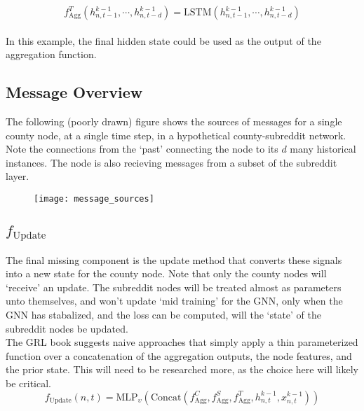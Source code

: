 \documentclass{article}
\begin{document}
$$f_{\text{Agg}}^T(h_{n,t-1}^{k-1}, \cdots, h_{n, t-d}^{k-1}) = \text{LSTM}(h_{n,t-1}^{k-1}, \cdots, h_{n, t-d}^{k-1})$$\\
In this example, the final hidden state could be used as the output of the aggregation function. 

\subsection{Message Overview}
The following (poorly drawn) figure shows the sources of messages for a single county node, at a single time step, in a hypothetical county-subreddit network. Note the connections from the `past' connecting the node to its $d$ many historical instances. The node is also recieving messages from a subset of the subreddit layer. 

\begin{figure}[h]
\texttt{[image: message\_sources]}
\end{figure}

\subsection{$f_{\text{Update}}$}
The final missing component is the update method that converts these signals into a new state for the county node. Note that only the county nodes will `receive' an update. The subreddit nodes will be treated almost as parameters unto themselves, and won't update `mid training' for the GNN, only when the GNN has stabalized, and the loss can be computed, will the `state' of the subreddit nodes be updated.\\

The GRL book suggests naive approaches that simply apply a thin parameterized function over a concatenation of the aggregation outputs, the node features, and the prior state. This will need to be researched more, as the choice here will likely be critical.\\

$$f_{\text{Update}}(n,t) = \text{MLP}_{\upsilon}\left(\text{Concat}\left(
						f_{\text{Agg}}^C,
						f_{\text{Agg}}^S,
						f_{\text{Agg}}^T, 
						h_{n, t}^{k-1}, x_{n, t}^{k-1}\right)\right)$$
\end{document}
